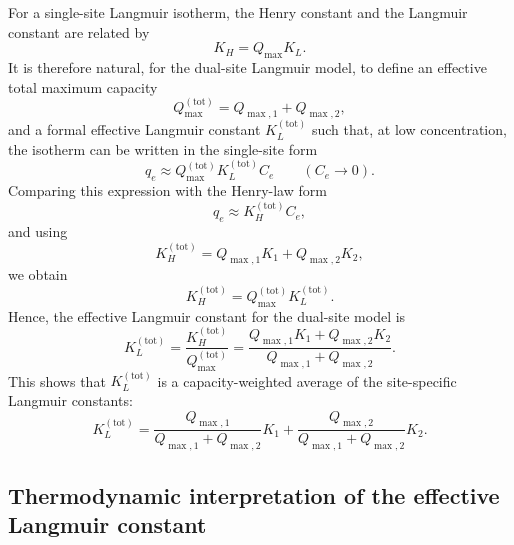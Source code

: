 \documentclass[12pt]{article}
\begin{document}
	For a single-site Langmuir isotherm, the Henry constant and the
	Langmuir constant are related by
	\begin{equation}
		K_H = Q_{\max} K_L.
	\end{equation}
	It is therefore natural, for the dual-site Langmuir model, to define
	an effective total maximum capacity
	\begin{equation}
		Q_{\max}^{\mathrm{(tot)}} = Q_{\max,1} + Q_{\max,2},
	\end{equation}
	and a formal effective Langmuir constant \(K_L^{\mathrm{(tot)}}\)
	such that, at low concentration, the isotherm can be written in the
	single-site form
	\begin{equation}
		q_e \approx Q_{\max}^{\mathrm{(tot)}} K_L^{\mathrm{(tot)}} C_e
		\qquad (C_e \to 0).
	\end{equation}
	Comparing this expression with the Henry-law form
	\begin{equation}
		q_e \approx K_H^{\mathrm{(tot)}} C_e,
	\end{equation}
	and using
	\begin{equation}
		K_H^{\mathrm{(tot)}} = Q_{\max,1} K_1 + Q_{\max,2} K_2,
	\end{equation}
	we obtain
	\begin{equation}
		K_H^{\mathrm{(tot)}} = Q_{\max}^{\mathrm{(tot)}} K_L^{\mathrm{(tot)}}.
	\end{equation}
	Hence, the effective Langmuir constant for the dual-site model is
	\begin{equation}
		K_L^{\mathrm{(tot)}}
		= \frac{K_H^{\mathrm{(tot)}}}{Q_{\max}^{\mathrm{(tot)}}}
		= \frac{Q_{\max,1} K_1 + Q_{\max,2} K_2}
		{Q_{\max,1} + Q_{\max,2}}.
	\end{equation}
	This shows that \(K_L^{\mathrm{(tot)}}\) is a capacity-weighted
	average of the site-specific Langmuir constants:
	\begin{equation}
		\boxed{
			K_L^{\mathrm{(tot)}}
			= \frac{Q_{\max,1}}{Q_{\max,1} + Q_{\max,2}} K_1
			+ \frac{Q_{\max,2}}{Q_{\max,1} + Q_{\max,2}} K_2.
		}
	\end{equation}
	
	\subsection{Thermodynamic interpretation of the effective Langmuir constant}
	
\end{document}
